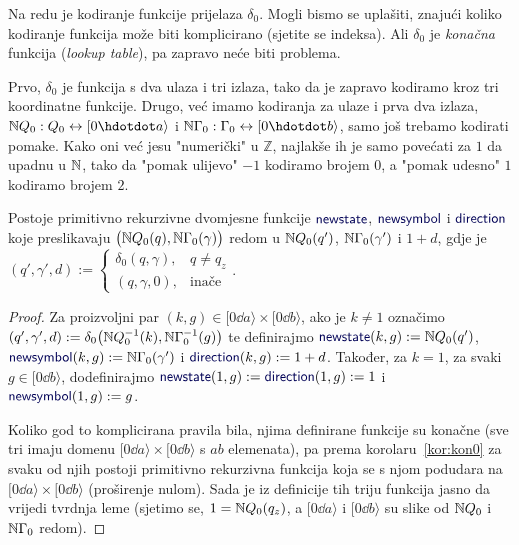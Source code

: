 Na redu je kodiranje funkcije prijelaza $\delta_0$. Mogli bismo se uplašiti, znajući koliko kodiranje funkcija može biti komplicirano (sjetite se indeksa). Ali $\delta_0$ je \emph{konačna} funkcija (\emph{lookup table}), pa zapravo neće biti problema.

Prvo, $\delta_0$ je funkcija s dva ulaza i tri izlaza, tako da je zapravo kodiramo kroz tri koordinatne funkcije. Drugo, već imamo kodiranja za ulaze i prva dva izlaza, $\N Q_0:Q_0\leftrightarrow[0\dd a\rangle$ i $\N\Gamma_0:\Gamma_0\leftrightarrow[0\dd b\rangle$, samo još trebamo kodirati pomake. Kako oni već jesu "numerički" u $\mathbb Z$, najlakše ih je samo povećati za $1$ da upadnu u ${\mathbb N}$, tako da "pomak ulijevo" $-1$ kodiramo brojem $0$, a "pomak udesno" $1$ kodiramo brojem $2$.

\begin{lema}[{name=[primitivna rekurzivnost funkcije prijelaza]}]\label{lm:newssdprn}
Postoje primitivno rekurzivne dvomjesne funkcije $\f{newstate}$, $\f{newsymbol}$ i $\f{direction}$ koje preslikavaju $\bigl({\mathbb N} Q_0(q),{\mathbb N}\Gamma_0(\gamma)\bigr)$ redom u ${\mathbb N} Q_0(q')$, ${\mathbb N}\Gamma_0(\gamma')$ i $1+d$, gdje je 
$(q',\gamma',d):=\begin{cases}
\delta_0(q,\gamma),& q\ne q_z\\
(q,\gamma,0),&\text{inače}\end{cases}$.
\end{lema}
\begin{proof}
Za proizvoljni par $(k,g)\in[0\dd a\rangle\times[0\dd b\rangle$, ako je $k\ne 1$ označimo $(q',\gamma',d):=\delta_0\bigl({\mathbb N} Q_0^{-1}(k),{\mathbb N}\Gamma_0^{-1}(g)\bigr)$ te definirajmo $\f{newstate}(k,g):=\N Q_0(q')$, $\f{newsymbol}(k,g):=\N\Gamma_0(\gamma')$ i $\f{direction}(k,g):=1+d$. Također, za $k=1$, za svaki $g\in[0\dd b\rangle$, dodefinirajmo $\f{newstate}(1,g):=\f{direction}(1,g):=1$ i $\f{newsymbol}(1,g):=g$.

Koliko god to komplicirana pravila bila, njima definirane funkcije su konačne (sve tri imaju domenu $[0\dd a\rangle\times[0\dd b\rangle$ s $ab$ elemenata), pa prema korolaru~\ref{kor:kon0} za svaku od njih postoji primitivno rekurzivna funkcija koja se s njom podudara na $[0\dd a\rangle\times[0\dd b\rangle$ (proširenje nulom). Sada je iz definicije tih triju funkcija jasno da vrijedi tvrdnja leme (sjetimo se, $1={\mathbb N} Q_0(q_z)$, a $[0\dd a\rangle$ i $[0\dd b\rangle$ su slike od ${\mathbb N} Q_0$ i ${\mathbb N}\Gamma_0$ redom).
\end{proof}

